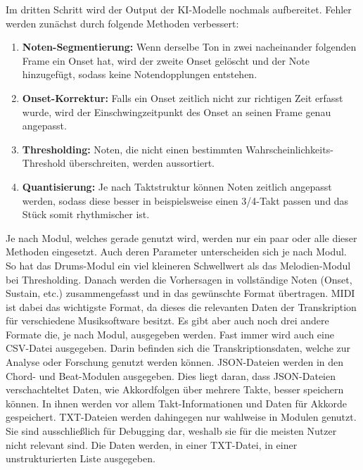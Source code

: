 Im dritten Schritt wird der Output der KI-Modelle nochmals aufbereitet.
Fehler werden zunächst durch folgende Methoden verbessert:
\begin{enumerate}
    \item \textbf{Noten-Segmentierung:} Wenn derselbe Ton in zwei nacheinander folgenden Frame ein Onset hat, wird der zweite Onset gelöscht und der Note hinzugefügt, sodass keine Notendopplungen entstehen.
    \item \textbf{Onset-Korrektur:} Falls ein Onset zeitlich nicht zur richtigen Zeit erfasst wurde, wird der Einschwingzeitpunkt des Onset an seinen Frame genau angepasst.
    \item \textbf{Thresholding:} Noten, die nicht einen bestimmten Wahrscheinlichkeits-Threshold überschreiten, werden aussortiert.
    \item \textbf{Quantisierung:} Je nach Taktstruktur können Noten zeitlich angepasst werden, sodass diese besser in beispielsweise einen 3/4-Takt passen und das Stück somit rhythmischer ist.
\end{enumerate}
Je nach Modul, welches gerade genutzt wird, werden nur ein paar oder alle dieser Methoden eingesetzt.
Auch deren Parameter unterscheiden sich je nach Modul.
So hat das Drums-Modul ein viel kleineren Schwellwert als das Melodien-Modul bei Thresholding.
Danach werden die Vorhersagen in vollständige Noten (Onset, Sustain, etc.)
zusammengefasst und in das gewünschte Format übertragen.
MIDI ist dabei das wichtigste Format, da dieses die relevanten Daten der Transkription für verschiedene Musiksoftware besitzt.
Es gibt aber auch noch drei andere Formate die, je nach Modul, ausgegeben werden.
Fast immer wird auch eine CSV-Datei ausgegeben.
Darin befinden sich die Transkriptionsdaten, welche zur Analyse oder Forschung genutzt werden können.
JSON-Dateien werden in den Chord- und Beat-Modulen ausgegeben.
Dies liegt daran, dass JSON-Dateien verschachteltet Daten, wie Akkordfolgen über mehrere Takte, besser speichern können.
In ihnen werden vor allem Takt-Informationen und Daten für Akkorde gespeichert.
TXT-Dateien werden dahingegen nur wahlweise in Modulen genutzt.
Sie sind ausschließlich für Debugging dar, weshalb sie für die meisten Nutzer nicht relevant sind.
Die Daten werden, in einer TXT-Datei, in einer unstrukturierten Liste ausgegeben.

